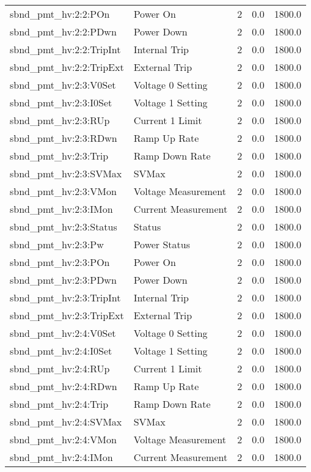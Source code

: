 \begin{center}
\begin{longtable}{l | l l l l }
sbnd\_pmt\_hv:2:2:POn & Power On & 2 & 0.0 & 1800.0\\ 
sbnd\_pmt\_hv:2:2:PDwn & Power Down & 2 & 0.0 & 1800.0\\ 
sbnd\_pmt\_hv:2:2:TripInt & Internal Trip & 2 & 0.0 & 1800.0\\ 
sbnd\_pmt\_hv:2:2:TripExt & External Trip & 2 & 0.0 & 1800.0\\ 
sbnd\_pmt\_hv:2:3:V0Set & Voltage 0 Setting & 2 & 0.0 & 1800.0\\ 
sbnd\_pmt\_hv:2:3:I0Set & Voltage 1 Setting & 2 & 0.0 & 1800.0\\ 
sbnd\_pmt\_hv:2:3:RUp & Current 1 Limit & 2 & 0.0 & 1800.0\\ 
sbnd\_pmt\_hv:2:3:RDwn & Ramp Up Rate & 2 & 0.0 & 1800.0\\ 
sbnd\_pmt\_hv:2:3:Trip & Ramp Down Rate & 2 & 0.0 & 1800.0\\ 
sbnd\_pmt\_hv:2:3:SVMax & SVMax & 2 & 0.0 & 1800.0\\ 
sbnd\_pmt\_hv:2:3:VMon & Voltage Measurement & 2 & 0.0 & 1800.0\\ 
sbnd\_pmt\_hv:2:3:IMon & Current Measurement & 2 & 0.0 & 1800.0\\ 
sbnd\_pmt\_hv:2:3:Status & Status & 2 & 0.0 & 1800.0\\ 
sbnd\_pmt\_hv:2:3:Pw & Power Status & 2 & 0.0 & 1800.0\\ 
sbnd\_pmt\_hv:2:3:POn & Power On & 2 & 0.0 & 1800.0\\ 
sbnd\_pmt\_hv:2:3:PDwn & Power Down & 2 & 0.0 & 1800.0\\ 
sbnd\_pmt\_hv:2:3:TripInt & Internal Trip & 2 & 0.0 & 1800.0\\ 
sbnd\_pmt\_hv:2:3:TripExt & External Trip & 2 & 0.0 & 1800.0\\ 
sbnd\_pmt\_hv:2:4:V0Set & Voltage 0 Setting & 2 & 0.0 & 1800.0\\ 
sbnd\_pmt\_hv:2:4:I0Set & Voltage 1 Setting & 2 & 0.0 & 1800.0\\ 
sbnd\_pmt\_hv:2:4:RUp & Current 1 Limit & 2 & 0.0 & 1800.0\\ 
sbnd\_pmt\_hv:2:4:RDwn & Ramp Up Rate & 2 & 0.0 & 1800.0\\ 
sbnd\_pmt\_hv:2:4:Trip & Ramp Down Rate & 2 & 0.0 & 1800.0\\ 
sbnd\_pmt\_hv:2:4:SVMax & SVMax & 2 & 0.0 & 1800.0\\ 
sbnd\_pmt\_hv:2:4:VMon & Voltage Measurement & 2 & 0.0 & 1800.0\\ 
sbnd\_pmt\_hv:2:4:IMon & Current Measurement & 2 & 0.0 & 1800.0\\ 

\end{longtable}
\end{center}
